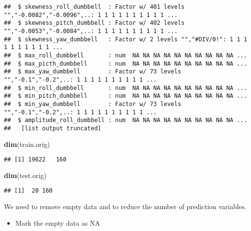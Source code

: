 \documentclass[]{article}
\newenvironment{Shaded}{\begin{snugshade}}{\end{snugshade}}
\newcommand{\KeywordTok}[1]{\textcolor[rgb]{0.13,0.29,0.53}{\textbf{{#1}}}}
\newcommand{\DecValTok}[1]{\textcolor[rgb]{0.00,0.00,0.81}{{#1}}}
\newcommand{\StringTok}[1]{\textcolor[rgb]{0.31,0.60,0.02}{{#1}}}
\newcommand{\OtherTok}[1]{\textcolor[rgb]{0.56,0.35,0.01}{{#1}}}
\newcommand{\NormalTok}[1]{{#1}}
\begin{document}
\begin{verbatim}
##  $ skewness_roll_dumbbell  : Factor w/ 401 levels "","-0.0082","-0.0096",..: 1 1 1 1 1 1 1 1 1 1 ...
##  $ skewness_pitch_dumbbell : Factor w/ 402 levels "","-0.0053","-0.0084",..: 1 1 1 1 1 1 1 1 1 1 ...
##  $ skewness_yaw_dumbbell   : Factor w/ 2 levels "","#DIV/0!": 1 1 1 1 1 1 1 1 1 1 ...
##  $ max_roll_dumbbell       : num  NA NA NA NA NA NA NA NA NA NA ...
##  $ max_picth_dumbbell      : num  NA NA NA NA NA NA NA NA NA NA ...
##  $ max_yaw_dumbbell        : Factor w/ 73 levels "","-0.1","-0.2",..: 1 1 1 1 1 1 1 1 1 1 ...
##  $ min_roll_dumbbell       : num  NA NA NA NA NA NA NA NA NA NA ...
##  $ min_pitch_dumbbell      : num  NA NA NA NA NA NA NA NA NA NA ...
##  $ min_yaw_dumbbell        : Factor w/ 73 levels "","-0.1","-0.2",..: 1 1 1 1 1 1 1 1 1 1 ...
##  $ amplitude_roll_dumbbell : num  NA NA NA NA NA NA NA NA NA NA ...
##   [list output truncated]
\end{verbatim}

\begin{Shaded}
\begin{Highlighting}[]
\KeywordTok{dim}\NormalTok{(train.orig)}
\end{Highlighting}
\end{Shaded}

\begin{verbatim}
## [1] 19622   160
\end{verbatim}

\begin{Shaded}
\begin{Highlighting}[]
\KeywordTok{dim}\NormalTok{(test.orig)}
\end{Highlighting}
\end{Shaded}

\begin{verbatim}
## [1]  20 160
\end{verbatim}

We need to remove empty data and to reduce the number of prediction
variables.

\begin{itemize}
\itemsep1pt\parskip0pt
\item
  Mark the empty data as NA
\end{itemize}

\begin{Shaded}
\end{Shaded}
\end{document}
